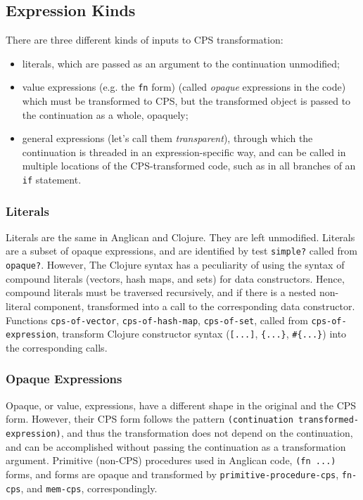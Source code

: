 \documentclass[a4paper]{article}
\begin{document}
\subsection{Expression Kinds}

There are three different kinds of inputs to CPS transformation:
\begin{itemize}
	\item literals, which are passed as an argument to the
		continuation unmodified;
	\item value expressions (e.g. the \texttt{fn} form) 
		(called \textit{opaque}
		expressions in the code) which must be transformed to
		CPS, but the transformed object is passed to the
		continuation as a whole, opaquely;
	\item general expressions (let's call them
		\textit{transparent}), through which the continuation is
		threaded in an expression-specific way, and can be
		called in multiple locations of the CPS-transformed
		code, such as in all branches of an \texttt{if}
		statement.
\end{itemize}

\subsubsection{Literals}

Literals are the same in Anglican and Clojure. They are 
left unmodified. Literals are a subset of opaque expressions,
and are identified by test \texttt{simple?} called from
\texttt{opaque?}.  However, The Clojure syntax has a peculiarity
of using the syntax of compound literals (vectors, hash maps,
and sets) for data constructors. Hence, compound literals must
be traversed recursively, and if there is a nested non-literal
component, transformed into a call to the corresponding data
constructor. Functions \texttt{cps-of-vector},
\texttt{cps-of-hash-map}, \texttt{cps-of-set}, called from
\texttt{cps-of-expression}, transform Clojure constructor syntax
(\texttt{[...]}, \texttt{\{...\}}, \texttt{\#\{...\}}) into the
corresponding calls.

\subsubsection{Opaque Expressions}

Opaque, or value, expressions, have a different shape in the
original and the CPS form. However, their CPS form follows the
pattern \texttt{(continuation transformed-expression)}, and thus
the transformation does not depend on the continuation, and
can be accomplished without passing the continuation as a
transformation argument. Primitive (non-CPS) procedures used in
Anglican code, \texttt{(fn ...)} forms, and 
forms are opaque and transformed by
\texttt{primitive-procedure-cps}, \texttt{fn-cps}, and
\texttt{mem-cps}, correspondingly.
\end{document}
